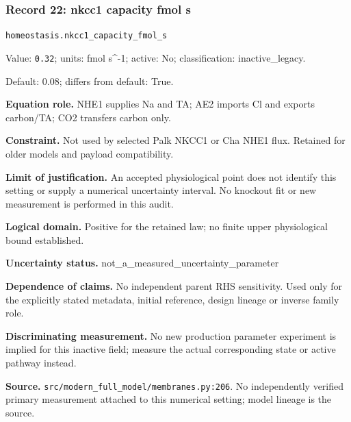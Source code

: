 \subsubsection*{Record 22: nkcc1 capacity fmol s}
{\small \nolinkurl{homeostasis.nkcc1_capacity_fmol_s}\par

Value: \texttt{0.32}; units: fmol s\textasciicircum{}-1; active: No; classification: inactive\_legacy.\par

Default: 0.08; differs from default: True.\par

\textbf{Equation role.} NHE1 supplies Na and TA; AE2 imports Cl and exports carbon/TA; CO2 transfers carbon only.\par

\textbf{Constraint.} Not used by selected Palk NKCC1 or Cha NHE1 flux. Retained for older models and payload compatibility.\par

\textbf{Limit of justification.} An accepted physiological point does not identify this setting or supply a numerical uncertainty interval. No knockout fit or new measurement is performed in this audit.\par

\textbf{Logical domain.} Positive for the retained law; no finite upper physiological bound established.\par

\textbf{Uncertainty status.} not\_a\_measured\_uncertainty\_parameter\par

\textbf{Dependence of claims.} No independent parent RHS sensitivity. Used only for the explicitly stated metadata, initial reference, design lineage or inverse family role.\par

\textbf{Discriminating measurement.} No new production parameter experiment is implied for this inactive field; measure the actual corresponding state or active pathway instead.\par

\textbf{Source.} \nolinkurl{src/modern_full_model/membranes.py:206}. No independently verified primary measurement attached to this numerical setting; model lineage is the source.\par}

